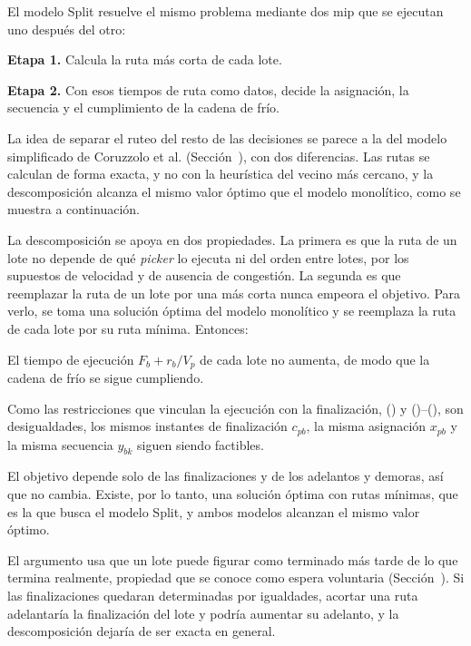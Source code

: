 \stopsubsection
\stopsection

\startsection[title={Modelo en dos etapas (Split)}, reference=sec:modelo_split]

El modelo Split resuelve el mismo problema mediante dos \ac{mip} que se
ejecutan uno después del otro:
\startitemize[n]
	\item {\bf Etapa 1.} Calcula la ruta más corta de cada lote.
	\item {\bf Etapa 2.} Con esos tiempos de ruta como datos, decide la
	asignación, la secuencia y el cumplimiento de la cadena de frío.
\stopitemize

La idea de separar el ruteo del resto de las decisiones se parece a la del
modelo simplificado de Coruzzolo et al. (Sección~),
con dos diferencias. Las rutas se calculan de forma exacta, y no con la
heurística del vecino más cercano, y la descomposición alcanza el mismo valor
óptimo que el modelo monolítico, como se muestra a continuación.

La descomposición se apoya en dos propiedades. La primera es que la ruta de
un lote no depende de qué {\em picker} lo ejecuta ni del orden entre lotes,
por los supuestos de velocidad y de ausencia de congestión. La segunda es que
reemplazar la ruta de un lote por una más corta nunca empeora el objetivo.
Para verlo, se toma una solución óptima del modelo monolítico y se reemplaza
la ruta de cada lote por su ruta mínima. Entonces:
\startitemize[n]
	\item El tiempo de ejecución $F_b + r_b / V_p$ de cada lote no aumenta, de
	modo que la cadena de frío se sigue cumpliendo.
	\item Como las restricciones que vinculan la ejecución con
la finalización, () y
()--(), son desigualdades, los mismos
instantes de finalización $c_{pb}$, la misma asignación $x_{pb}$ y la misma secuencia $y_{bk}$ siguen siendo factibles.
	\item El objetivo depende solo de las finalizaciones y de los adelantos y
	demoras, así que no cambia.
\stopitemize
Existe, por lo
tanto, una solución óptima con rutas mínimas, que es la que busca el modelo
Split, y ambos modelos alcanzan el mismo valor óptimo.

El argumento usa que un lote puede figurar como terminado más tarde de lo que
termina realmente, propiedad que se conoce como espera voluntaria
(Sección~). Si las finalizaciones quedaran
determinadas por igualdades, acortar una ruta adelantaría la finalización del
lote y podría aumentar su adelanto, y la descomposición dejaría de ser exacta
en general.

